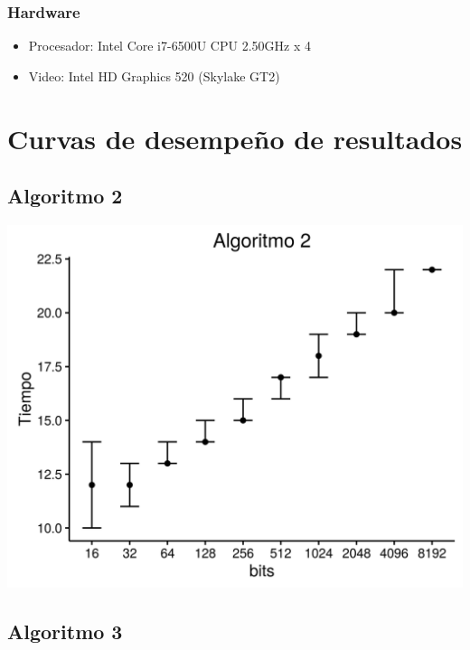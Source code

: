 \documentclass[12pt,letterpaper]{scrartcl}
\begin{document}
\subsubsection{Hardware}
\begin{itemize}
\item Procesador: Intel Core i7-6500U CPU  2.50GHz x 4 
\item Video: Intel HD Graphics 520 (Skylake GT2) 
\end{itemize}


\newpage

\section{Curvas de desempeño de resultados}

\subsection{Algoritmo 2}

\begin{center}
	\includegraphics[scale=1]{plot/a2.png}
\end{center}	

\newpage


\subsection{Algoritmo 3}
\end{document}
